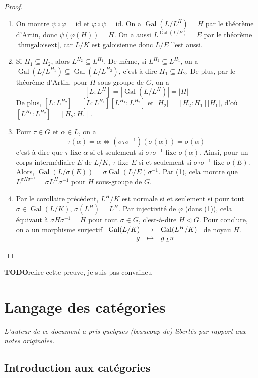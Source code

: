 \documentclass{article}
\newcommand{\id}{\mathrm{id}}
\DeclareMathOperator{\Gal}{Gal}
\newcommand{\todo}{\textbf{TODO}}
\newcommand{\applic}[4]{\begin{array}[t]{rcl}
#1 & \to & #2 \\
#3 & \mapsto & #4
\end{array}}
\renewcommand{\subset}{\subseteq}
\theoremstyle{plain}
\theoremstyle{definition}
\theoremstyle{remark}
\begin{document}
\begin{proof} \leavevmode
    \begin{enumerate}
        \item On montre $\psi \circ \varphi = \id$ et $\varphi \circ \psi = \id$. On a $\Gal(L/L^H) = H$ par le théorème d'Artin, donc $\psi(\varphi(H)) = H$. On a aussi $L^{\Gal(L/E)} = E$ par le théorème \ref{thmgaloisext}, car $L/K$ est galoisienne donc $L/E$ l'est aussi.
        \item Si $H_1 \subseteq H_2$, alors $L^{H_2} \subseteq L^{H_1}$. De même, si $L^{H_2} \subseteq L^{H_1}$, on a $\Gal(L/L^{H_1}) \subseteq \Gal(L/L^{H_2})$, c'est-à-dire $H_1 \subset H_2$. De plus, par le théorème d'Artin, pour $H$ sous-groupe de $G$, on a
        \[[L : L^H] = |\Gal(L/L^H)| = |H|\]
        De plus, $[L : L^{H_2}] = [L : L^{H_1}] [L^{H_1} : L^{H_2}]$ et $|H_2| = [H_2 : H_1] |H_1|$, d'où $[L^{H_1} : L^{H_2}] = [H_2 : H_1]$.
        \item Pour $\tau \in G$ et $\alpha \in L$, on a
        \[\tau (\alpha) = \alpha \iff (\sigma\tau \sigma^{-1})(\sigma(\alpha)) = \sigma(\alpha)\]
        c'est-à-dire que $\tau$ fixe $\alpha$ si et seulement si $\sigma\tau\sigma^{-1}$ fixe $\sigma(\alpha)$. Ainsi, pour un corps intermédiaire $E$ de $L/K$, $\tau$ fixe $E$ si et seulement si $\sigma \tau \sigma^{-1}$ fixe $\sigma(E)$. Alors, $\Gal(L/\sigma(E)) = \sigma\Gal(L/E)\sigma^{-1}$. Par (1), cela montre que $L^{\sigma H \sigma^{-1}} = \sigma L^H \sigma^{-1}$ pour $H$ sous-groupe de $G$.
        \item Par le corollaire précédent, $L^H/K$ est normale si et seulement si pour tout $\sigma \in \Gal(L/K)$, $\sigma(L^H) = L^H$. Par injectivité de $\varphi$ (dans (1)), cela équivaut à $\sigma H \sigma^{-1} = H$ pour tout $\sigma \in G$, c'est-à-dire $H \lhd G$. Pour conclure, on a un morphisme surjectif $\applic{\Gal(L/K)}{\Gal(L^H/K)}{g}{g_{\mid L^H}}$ de noyau $H$.
    \end{enumerate}
\end{proof}

\todo relire cette preuve, je suis pas convaincu
\newpage
\section{Langage des catégories}

\emph{L'auteur de ce document a pris quelques (beaucoup de) libertés par rapport aux notes originales.}

\subsection{Introduction aux catégories}
\end{document}
